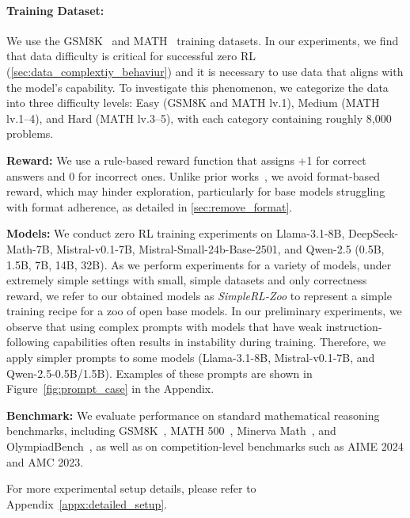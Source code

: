 \paragraph{Training Dataset:} We use the GSM8K~\citep{cobbe2021training} and MATH~\citep{hendrycks2021measuring} training datasets. In our experiments, we find that data difficulty is critical for successful zero RL (\textsection\ref{sec:data_complextiy_behaviur}) and it is necessary to use data that aligns with the model's capability. To investigate this phenomenon, we categorize the data into three difficulty levels: Easy (GSM8K and MATH lv.1), Medium (MATH lv.1–4), and Hard (MATH lv.3–5), with each category containing roughly 8,000 problems.
\label{sec:reward_remove}

\textbf{Reward: } We use a rule-based reward function that assigns +1 for correct answers and 0 for incorrect ones. Unlike prior works~\citep{deepscaler2025,chen2025empirical}, we avoid format-based reward, which may hinder exploration, particularly for base models struggling with format adherence, as detailed in \textsection\ref{sec:remove_format}.

\textbf{Models: }We conduct zero RL training experiments on Llama-3.1-8B, DeepSeek-Math-7B, Mistral-v0.1-7B, Mistral-Small-24b-Base-2501, and Qwen-2.5 (0.5B, 1.5B, 7B, 14B, 32B). As we perform experiments for a variety of models, under extremely simple settings with small, simple datasets and only correctness reward, we refer to our obtained models as \emph{SimpleRL-Zoo} to represent a simple training recipe for a zoo of open base models. In our preliminary experiments, we observe that using complex prompts with models that have weak instruction-following capabilities often results in instability during training. Therefore, we apply simpler prompts to some models (Llama-3.1-8B, Mistral-v0.1-7B, and Qwen-2.5-0.5B/1.5B). Examples of these prompts are shown in Figure~\ref{fig:prompt_case} in the Appendix.

\textbf{Benchmark: }We evaluate performance on standard mathematical reasoning benchmarks, including GSM8K~\citep{cobbe2021training}, MATH 500~\citep{hendrycks2021measuring}, Minerva Math~\citep{lewkowycz2022solving}, and OlympiadBench~\citep{he2024olympiadbench}, as well as on competition-level benchmarks such as AIME 2024 and AMC 2023.

For more experimental setup details, please refer to Appendix~\ref{appx:detailed_setup}.

